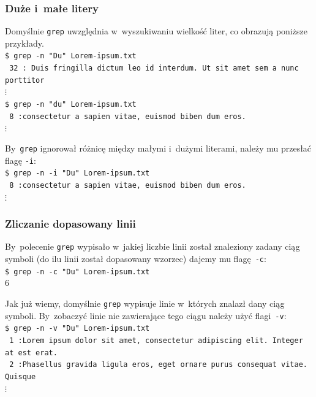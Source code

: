 \documentclass[10pt,t]{beamer}
\begin{document}
\begin{frame}
  \frametitle{Duże i~małe litery}


  Domyślnie \texttt{grep} uwzględnia w~wyszukiwaniu wielkość liter, co
  obrazują poniższe przykłady. \\
  \texttt{\$ grep -n "Du"{} Lorem-ipsum.txt} \\
  \texttt{{\color{green} 32}{\color{jAxisBlue} :}{\color{red} Du}is
    fringilla dictum leo id
    interdum. Ut sit amet sem a nunc porttitor} \\
  \hspace{1em} $\vdots$ \\
  \texttt{\$ grep -n "du"{} Lorem-ipsum.txt} \\
  \texttt{{\color{green} 8}{\color{jAxisBlue} :}consectetur a sapien vitae,
    euismod biben{\color{red} du}m eros.} \\
  \hspace{1em} $\vdots$

  By~\texttt{grep} ignorował różnicę między małymi i~dużymi literami,
  należy mu przesłać flagę \texttt{-i}: \\
  \texttt{\$ grep -n -i "Du"{} Lorem-ipsum.txt} \\
  \texttt{{\color{green} 8}{\color{jAxisBlue} :}consectetur a sapien vitae,
    euismod biben{\color{red} du}m eros.} \\
  \hspace{1em} $\vdots$

\end{frame}





\begin{frame}
  \frametitle{Zliczanie dopasowany linii}


  By~polecenie \texttt{grep} wypisało w~jakiej liczbie linii został
  znaleziony zadany ciąg symboli (do ilu linii został dopasowany wzorzec)
  dajemy mu flagę~\texttt{-c}: \\
  \texttt{\$ grep -n -c "Du"{} Lorem-ipsum.txt} \\
  \texttt{$6$}

  Jak już wiemy, domyślnie \texttt{grep} wypisuje linie w~których znalazł
  dany ciąg symboli. By~zobaczyć linie \alert{nie} zawierające tego ciągu
  należy użyć flagi~\texttt{-v}: \\
  \texttt{\$ grep -n -v "Du"{} Lorem-ipsum.txt} \\
  \texttt{{\color{green} 1}{\color{jAxisBlue} :}Lorem ipsum dolor sit amet,
    consectetur adipiscing elit. Integer at est erat.} \\
  \texttt{{\color{green} 2}{\color{jAxisBlue} :}Phasellus gravida ligula
    eros, eget ornare purus consequat vitae. Quisque} \\
  \hspace{1em} $\vdots$

\end{frame}
\end{document}
